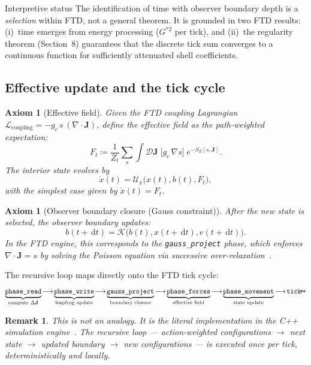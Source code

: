 \documentclass[11pt]{article}
\theoremstyle{tight}
\theoremstyle{plainroman}
\newtheorem{axiom}[theorem]{Axiom}
\newtheorem{remark}[theorem]{Remark}
\newcommand{\dd}{\,\mathrm{d}}
\begin{document}
\begin{cautionbox}{Interpretive status}
The identification of time with observer boundary depth is a \emph{selection} within FTD, not a general theorem.
It is grounded in two FTD results: (i)~time emerges from energy processing ($G^{*2}$ per tick), and (ii)~the regularity theorem (Section~8) guarantees that the discrete tick sum converges to a continuous function for sufficiently attenuated shell coefficients.
\end{cautionbox}

\subsection{Effective update and the tick cycle}

\begin{axiom}[Effective field]
Given the FTD coupling Lagrangian $\mathcal L_{\text{coupling}}=-g_c\,s\,(\nabla\!\cdot\!\mathbf J)$, define the effective field as the path-weighted expectation:
\[
F_t \coloneqq \frac{1}{Z_t}\sum_s\int\mathcal D\mathbf J\;\bigl[g_c\,\nabla s\bigr]\;e^{-S_E[s,\mathbf J]}.
\]
The interior state evolves by
\[
\dot x(t)=\mathcal U_x\bigl(x(t),b(t),F_t\bigr),
\]
with the simplest case given by $\dot x(t)=F_t$.
\end{axiom}

\begin{axiom}[Observer boundary closure (Gauss constraint)]
After the new state is selected, the observer boundary updates:
\[
b(t+\dd t)=\mathcal K\bigl(b(t),x(t+\dd t),e(t+\dd t)\bigr).
\]
In the FTD engine, this corresponds to the \texttt{gauss\_project} phase, which enforces $\nabla\!\cdot\!\mathbf J=s$ by solving the Poisson equation via successive over-relaxation~\cite{ftdengine}.
\end{axiom}

The recursive loop maps directly onto the FTD tick cycle:
\[
\underbrace{\texttt{phase\_read}}_{\text{compute }\Delta\mathbf J}
\!\longrightarrow\!
\underbrace{\texttt{phase\_write}}_{\text{leapfrog update}}
\!\longrightarrow\!
\underbrace{\texttt{gauss\_project}}_{\text{boundary closure}}
\!\longrightarrow\!
\underbrace{\texttt{phase\_forces}}_{\text{effective field}}
\!\longrightarrow\!
\underbrace{\texttt{phase\_movement}}_{\text{state update}}
\!\longrightarrow\!
\texttt{tick\!+\!+}
\]

\begin{remark}
This is not an analogy. It is the literal implementation in the C++ simulation engine~\cite{ftdengine}.
The recursive loop --- action-weighted configurations $\to$ next state $\to$ updated boundary $\to$ new configurations --- is executed once per tick, deterministically and locally.
\end{remark}
\end{document}
